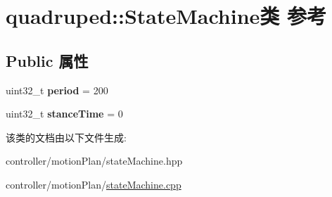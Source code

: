 \hypertarget{classquadruped_1_1StateMachine}{}\section{quadruped\+:\+:State\+Machine类 参考}
\label{classquadruped_1_1StateMachine}
\subsection*{Public 属性}
\begin{DoxyCompactItemize}
\item 
\mbox{\label{classquadruped_1_1StateMachine_a105927d0ab33d29e72f2ee6a67dffe85}} 
uint32\+\_\+t {\bfseries period} = 200
\item 
\mbox{\label{classquadruped_1_1StateMachine_a25577b87297698e036afffa90d8cef06}} 
uint32\+\_\+t {\bfseries stance\+Time} = 0
\end{DoxyCompactItemize}


该类的文档由以下文件生成\+:\begin{DoxyCompactItemize}
\item 
controller/motion\+Plan/state\+Machine.\+hpp\item 
controller/motion\+Plan/\hyperlink{stateMachine_8cpp}{state\+Machine.\+cpp}\end{DoxyCompactItemize}
